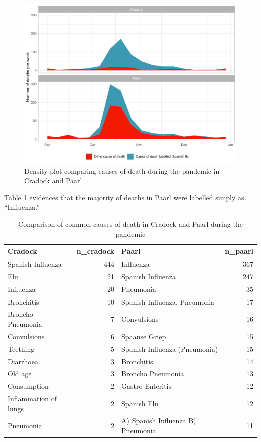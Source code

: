\documentclass[fleqn,10pt,lineno]{wlpeerj} %
\begin{document}
\begin{figure}
\centering
\includegraphics{spanish-flu-mortality_bookdown_files/figure-latex/cradock-paarl-causes-1.pdf}
\caption{\label{fig:cradock-paarl-causes}Density plot comparing causes of death during the pandemic in Cradock and Paarl}
\end{figure}

Table \ref{tab:cradock-paarl-causes-tab} evidences that the majority of deaths in Paarl were labelled simply as ``Influenza.''

\begin{table}

\caption{\label{tab:cradock-paarl-causes-tab}Comparison of common causes of death in Cradock and Paarl during the pandemic}
\centering
\begin{tabular}[t]{l|r|l|r}
\hline
Cradock & n\_cradock & Paarl & n\_paarl\\
\hline
Spanish Influenza & 444 & Influenza & 367\\
\hline
Flu & 21 & Spanish Influenza & 247\\
\hline
Influenza & 20 & Pneumonia & 35\\
\hline
Bronchitis & 10 & Spanish Influenza, Pneumonia & 17\\
\hline
Broncho Pneumonia & 7 & Convulsions & 16\\
\hline
Convulsions & 6 & Spaanse Griep & 15\\
\hline
Teething & 5 & Spanish Influenza (Pneumonia) & 15\\
\hline
Diarrhoea & 3 & Bronchitis & 14\\
\hline
Old age & 3 & Broncho Pneumonia & 13\\
\hline
Consumption & 2 & Gastro Enteritis & 12\\
\hline
Inflammation of lungs & 2 & Spanish Flu & 12\\
\hline
Pneumonia & 2 & A) Spanish Influenza B) Pneumonia & 11\\
\hline
\end{tabular}
\end{table}
\end{document}
